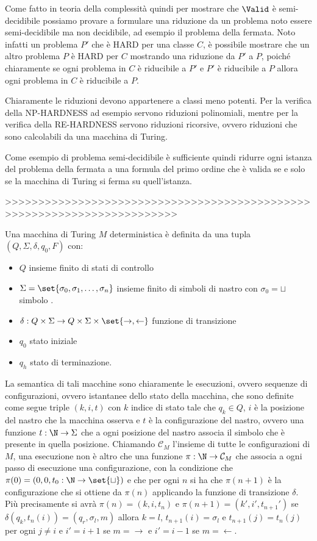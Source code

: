 Come fatto in teoria della complessità quindi per mostrare che \(\Valid\) è semi-decidibile possiamo provare a formulare una riduzione da un problema noto essere semi-decidibile ma non decidibile, ad esempio il problema della fermata. Noto infatti un problema \(P'\) che è HARD per una classe \(C\), è possibile mostrare che un altro problema \(P\) è HARD per \(C\) mostrando una riduzione da \(P'\) a \(P\), poiché chiaramente se ogni problema in \(C\) è riducibile a \(P'\) e \(P'\) è riducibile a \(P\) allora ogni problema in \(C\) è riducibile a \(P\).

Chiaramente le riduzioni devono appartenere a classi meno potenti. Per la verifica della NP-HARDNESS ad esempio servono riduzioni polinomiali, mentre per la verifica della RE-HARDNESS servono riduzioni ricorsive, ovvero riduzioni che sono calcolabili da una macchina di Turing.

Come esempio di problema semi-decidibile è sufficiente quindi ridurre ogni istanza del problema della fermata a una formula del primo ordine che è valida se e solo se la macchina di Turing si ferma su quell'istanza.

>>>>>>>>>>>>>>>>>>>>>>>>>>>>>>>>>>>>>>>>>>>>>>>>>>>>>>>>>>>>>>>>>>>>>>>>

Una macchina di Turing \(M\) deterministica è definita da una tupla \((Q, \Sigma, \delta, q_0, F)\) con:
\begin{itemize}
  \item \(Q\) insieme finito di stati di controllo
  \item \(\Sigma = \set{\sigma_0, \sigma_1, \ldots, \sigma_n}\) insieme finito di simboli di nastro con \(\sigma_0 = \sqcup\) simbolo .
  \item \(\delta: Q \times \Sigma \to Q \times \Sigma \times \set{\rightarrow, \leftarrow}\) funzione di transizione
  \item \(q_0\) stato iniziale
  \item \(q_h\) stato di terminazione.
\end{itemize}

La semantica di tali macchine sono chiaramente le esecuzioni, ovvero sequenze di configurazioni, ovvero istantanee dello stato della macchina, che sono definite come segue triple \((k,i,t)\) con \(k\) indice di stato tale che \(q_k\in Q\), \(i\) è la posizione del nastro che la macchina osserva e \(t\) è la configurazione del nastro, ovvero una funzione \(t:\N \to \Sigma\) che a ogni posizione del nastro associa il simbolo che è presente in quella posizione. Chiamando \(\mathcal{C}_M\) l'insieme di tutte le configurazioni di \(M\), una esecuzione non è altro che una funzione \(\pi: \N \to \mathcal{C}_M\) che associa a ogni passo di esecuzione una configurazione, con la condizione che \(\pi(0) = (0,0,t_0:\N\to\set{\sqcup})\) e che per ogni \(n\) si ha che \(\pi(n+1)\) è la configurazione che si ottiene da \(\pi(n)\) applicando la funzione di transizione \(\delta\). Più precisamente si avrà \(\pi(n) = (k,i,t_n)\) e \(\pi(n+1) = (k',i',t_{n+1}')\) se \(\delta(q_k,t_n(i)) = (q_r,\sigma_l,m)\) allora \(k = l\), \(t_{n+1}(i) = \sigma_l\) e \(t_{n+1}(j) = t_n(j)\) per ogni \(j \neq i\) e \(i' = i+1\) se \(m = \rightarrow\) e \(i' = i-1\) se \(m = \leftarrow\).

